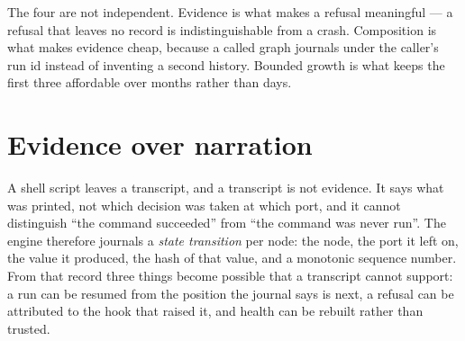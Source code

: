 The four are not independent. Evidence is what makes a refusal meaningful --- a refusal that leaves
no record is indistinguishable from a crash. Composition is what makes evidence cheap, because a
called graph journals under the caller's run id instead of inventing a second history. Bounded
growth is what keeps the first three affordable over months rather than days.

\begin{center}

\end{center}

\section{Evidence over narration}

A shell script leaves a transcript, and a transcript is not evidence. It says what was printed, not
which decision was taken at which port, and it cannot distinguish \enquote{the command succeeded}
from \enquote{the command was never run}. The engine therefore journals a \emph{state transition}
per node: the node, the port it left on, the value it produced, the hash of that value, and a
monotonic sequence number. From that record three things become possible that a transcript cannot
support: a run can be resumed from the position the journal says is next, a refusal can be
attributed to the hook that raised it, and health can be rebuilt rather than trusted.

